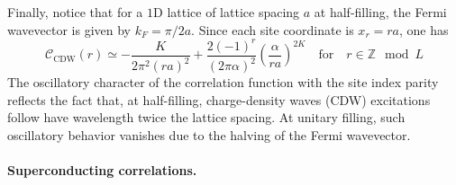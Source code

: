 Finally, notice that for a $1$D lattice of lattice spacing $a$ at half-filling, the Fermi wavevector is given by $k_F = \pi/2a$. Since each site coordinate is $x_r=ra$, one has
\[
	\mathcal{C}_\mathrm{CDW}(r) \simeq - \frac{K}{2\pi^2 (ra)^2} +  \frac{2 (-1)^r }{(2\pi\alpha)^2} \left(
	\frac{\alpha}{ra}
	\right)^{2K}
	\quad\text{for}\quad
	r \in \mathbb{Z} \mod L
\]
The oscillatory character of the correlation function with the site index parity reflects the fact that, at half-filling, charge-density waves (CDW) excitations follow have wavelength twice the lattice spacing. At unitary filling, such oscillatory behavior vanishes due to the halving of the Fermi wavevector.

\paragraph{Superconducting correlations.}

